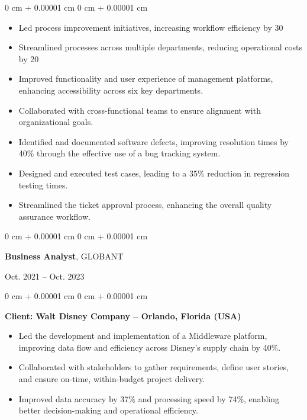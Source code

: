 \documentclass[10pt, letterpaper]{article}
\newenvironment{highlights}{
    \begin{itemize}[
        topsep=0.10 cm,
        parsep=0.10 cm,
        partopsep=0pt,
        itemsep=0pt,
        leftmargin=0 cm + 10pt
    ]
}{
    \end{itemize}
} %
\newenvironment{onecolentry}{
    \begin{adjustwidth}{
        0 cm + 0.00001 cm
    }{
        0 cm + 0.00001 cm
    }
}{
    \end{adjustwidth}
} %
\newenvironment{twocolentry}[2][]{
    \onecolentry
    \def\secondColumn{#2}
    \setcolumnwidth{\fill, 4.5 cm}
    \begin{paracol}{2}
}{
    \switchcolumn \raggedleft \secondColumn
    \end{paracol}
    \endonecolentry
} %
\begin{document}
        \vspace{0.10 cm}
        \begin{onecolentry}
            \begin{highlights}
                \item Led process improvement initiatives, increasing workflow efficiency by 30%
                \item Streamlined processes across multiple departments, reducing operational costs by 20%
                \item Improved functionality and user experience of management platforms, enhancing accessibility across six key departments.
                \item Collaborated with cross-functional teams to ensure alignment with organizational goals.
                \item Identified and documented software defects, improving resolution times by 40\% through the effective use of a bug tracking system. 
                \item Designed and executed test cases, leading to a 35\% reduction in regression testing times.
                \item Streamlined the ticket approval process, enhancing the overall quality assurance workflow.
            \end{highlights}
        \end{onecolentry}


        \vspace{0.5 cm}

        \begin{twocolentry}{
    Oct. 2021 -- Oct. 2023
}
    \textbf{Business Analyst}, GLOBANT
\end{twocolentry}
\vspace{0.10 cm}

        \begin{onecolentry}
            \textbf{Client: Walt Disney Company -- Orlando, Florida (USA)}
            \begin{highlights}
                \item Led the development and implementation of a Middleware platform, improving data flow and efficiency across Disney's supply chain by 40\%.
                \item Collaborated with stakeholders to gather requirements, define user stories, and ensure on-time, within-budget project delivery.
                \item Improved data accuracy by 37\% and processing speed by 74\%, enabling better decision-making and operational efficiency.
            \end{highlights}
        \end{onecolentry}
    
\end{document}
